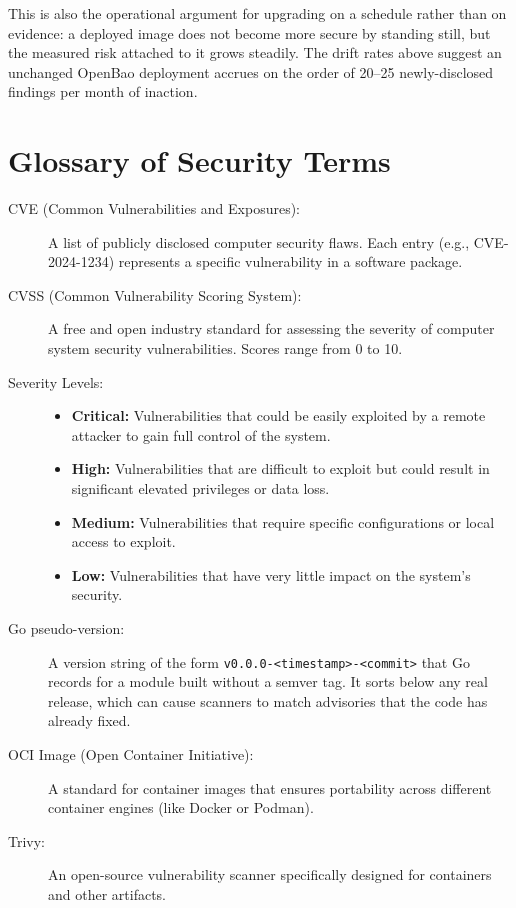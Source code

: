 \documentclass{article}
\begin{document}
This is also the operational argument for upgrading on a schedule rather than on evidence: a deployed image does not become more secure by standing still, but the measured risk attached to it grows steadily. The drift rates above suggest an unchanged OpenBao deployment accrues on the order of 20--25 newly-disclosed findings per month of inaction.

\section{Glossary of Security Terms}
\begin{description}
    \item[CVE (Common Vulnerabilities and Exposures):] A list of publicly disclosed computer security flaws. Each entry (e.g., CVE-2024-1234) represents a specific vulnerability in a software package.
    \item[CVSS (Common Vulnerability Scoring System):] A free and open industry standard for assessing the severity of computer system security vulnerabilities. Scores range from 0 to 10.
    \item[Severity Levels:]
    \begin{itemize}
        \item \textbf{Critical:} Vulnerabilities that could be easily exploited by a remote attacker to gain full control of the system.
        \item \textbf{High:} Vulnerabilities that are difficult to exploit but could result in significant elevated privileges or data loss.
        \item \textbf{Medium:} Vulnerabilities that require specific configurations or local access to exploit.
        \item \textbf{Low:} Vulnerabilities that have very little impact on the system's security.
    \end{itemize}
    \item[Go pseudo-version:] A version string of the form \texttt{v0.0.0-<timestamp>-<commit>} that Go records for a module built without a semver tag. It sorts below any real release, which can cause scanners to match advisories that the code has already fixed.
    \item[OCI Image (Open Container Initiative):] A standard for container images that ensures portability across different container engines (like Docker or Podman).
    \item[Trivy:] An open-source vulnerability scanner specifically designed for containers and other artifacts.
\end{description}
\end{document}
